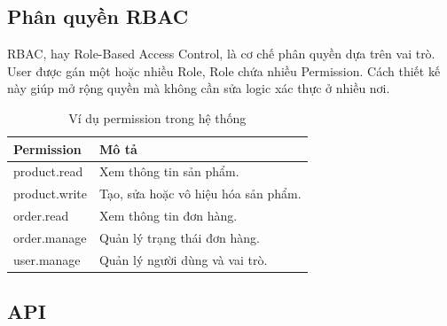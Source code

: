 \documentclass[../main.tex]{subfiles}
\begin{document}
\subsection{Phân quyền RBAC}
\label{subsection:2.4.3}

RBAC, hay Role-Based Access Control, là cơ chế phân quyền dựa trên vai trò. User được gán một hoặc nhiều Role, Role chứa nhiều Permission. Cách thiết kế này giúp mở rộng quyền mà không cần sửa logic xác thực ở nhiều nơi.

\begin{table}[H]
    \centering
    \caption{Ví dụ permission trong hệ thống}
    \label{tab:chapter2-permissions}
    \begin{tabular}{|p{}|p{}|}
        \hline
        \rowcolor{primary!35}
        \textbf{Permission} & \textbf{Mô tả} \\
        \hline
        product.read & Xem thông tin sản phẩm. \\
        \hline
        product.write & Tạo, sửa hoặc vô hiệu hóa sản phẩm. \\
        \hline
        order.read & Xem thông tin đơn hàng. \\
        \hline
        order.manage & Quản lý trạng thái đơn hàng. \\
        \hline
        user.manage & Quản lý người dùng và vai trò. \\
        \hline
    \end{tabular}
\end{table}

\subsection{API}
\label{subsection:2.4.4}
\end{document}
